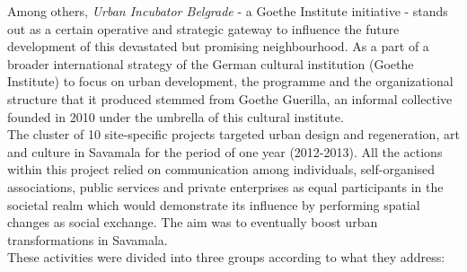 \documentclass[11pt]{report}
\begin{document}
Among others, \textit{Urban Incubator Belgrade} - a Goethe Institute initiative - stands out as a certain operative and strategic gateway to influence the future development of this devastated but promising neighbourhood.
As a part of a broader international strategy of the German cultural institution (Goethe Institute) to focus on urban development, the programme and the organizational structure that it produced stemmed from Goethe Guerilla, an informal collective founded in 2010 under the umbrella of this cultural institute.
\\

The cluster of 10 site-specific projects targeted urban design and regeneration, art and culture in Savamala for the period of one year (2012-2013). All the actions within this project relied on communication among individuals, self-organised associations, public services and private enterprises as equal participants in the societal realm which would demonstrate its influence by performing spatial changes as social exchange. The aim was to eventually boost urban transformations in Savamala.
\\
These activities were divided into three groups according to what they address:
\end{document}
